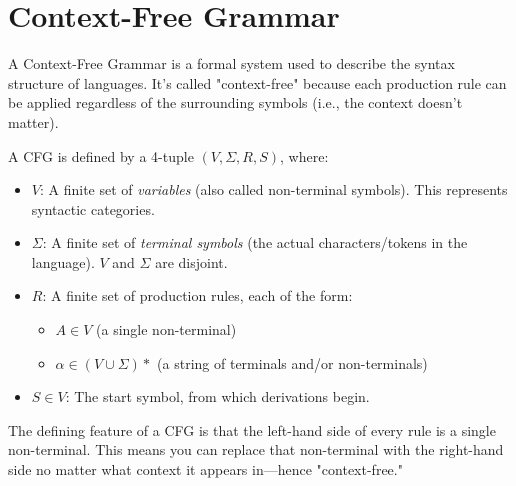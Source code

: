 \section{Context-Free Grammar}
\label{sec:context-free-grammar}

A Context-Free Grammar is a formal system used to describe the syntax structure of languages.
It's called "context-free" because each production rule can be applied regardless of the surrounding symbols
(i.e., the context doesn't matter).

A CFG is defined by a 4-tuple $(V, \Sigma, R, S)$, where:

\begin{itemize}
    \item $V$: A finite set of \textit{variables} (also called non-terminal symbols).
    This represents syntactic categories.
    \item $\Sigma$: A finite set of \textit{terminal symbols} (the actual characters/tokens in the language). $V$ and $\Sigma$ are disjoint.
    \item $R$: A finite set of production rules, each of the form:
    \begin{itemize}
        \item $A \in V$ (a single non-terminal)
        \item $\alpha \in (V \cup \Sigma)*$ (a string of terminals and/or non-terminals)
    \end{itemize}
    \item $S \in V$: The start symbol, from which derivations begin.
\end{itemize}

The defining feature of a CFG is that the left-hand side of every rule is a single non-terminal.
This means you can replace that non-terminal with the right-hand side no matter what context it appears in—hence "context-free."
